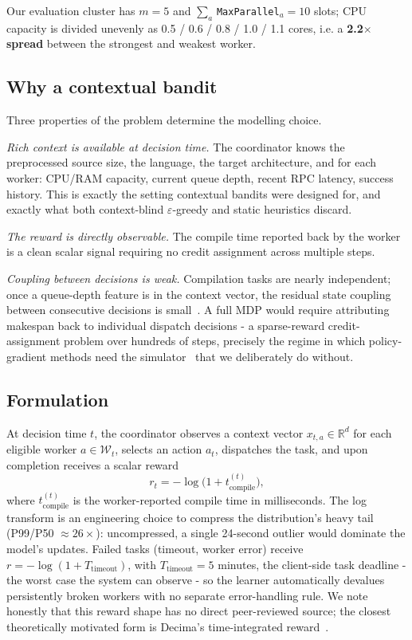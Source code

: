 \documentclass[final,5p,times,twocolumn]{elsarticle}
\begin{document}
Our evaluation cluster has $m=5$ and $\sum_a$\,\texttt{MaxParallel}$_a=10$ slots; CPU capacity is divided unevenly as 0.5 / 0.6 / 0.8 / 1.0 / 1.1 cores, i.e. a \textbf{2.2$\times$ spread} between the strongest and weakest worker.

\subsection{Why a contextual bandit}

Three properties of the problem determine the modelling choice.

\emph{Rich context is available at decision time.} The coordinator knows the preprocessed source size, the language, the target architecture, and for each worker: CPU/RAM capacity, current queue depth, recent RPC latency, success history. This is exactly the setting contextual bandits were designed for, and exactly what both context-blind $\varepsilon$-greedy and static heuristics discard.

\emph{The reward is directly observable.} The compile time reported back by the worker is a clean scalar signal requiring no credit assignment across multiple steps.

\emph{Coupling between decisions is weak.} Compilation tasks are nearly independent; once a queue-depth feature is in the context vector, the residual state coupling between consecutive decisions is small~\cite{slivkins2019}. A full MDP would require attributing makespan back to individual dispatch decisions - a sparse-reward credit-assignment problem over hundreds of steps, precisely the regime in which policy-gradient methods need the simulator~\cite{deeprm,decima} that we deliberately do without.

\subsection{Formulation}

At decision time $t$, the coordinator observes a context vector $x_{t,a}\in\mathbb{R}^d$ for each eligible worker $a\in\mathcal{W}_t$, selects an action $a_t$, dispatches the task, and upon completion receives a scalar reward
\begin{equation}
r_t=-\log\bigl(1+t_{\text{compile}}^{(t)}\bigr),
\end{equation}
where $t_{\text{compile}}^{(t)}$ is the worker-reported compile time in milliseconds. The log transform is an engineering choice to compress the distribution's heavy tail (P99/P50 $\approx26\times$): uncompressed, a single 24-second outlier would dominate the model's updates. Failed tasks (timeout, worker error) receive $r=-\log(1+T_{\text{timeout}})$, with $T_{\text{timeout}}=5$ minutes, the client-side task deadline - the worst case the system can observe - so the learner automatically devalues persistently broken workers with no separate error-handling rule. We note honestly that this reward shape has no direct peer-reviewed source; the closest theoretically motivated form is Decima's time-integrated reward~\cite{decima}.
\end{document}
